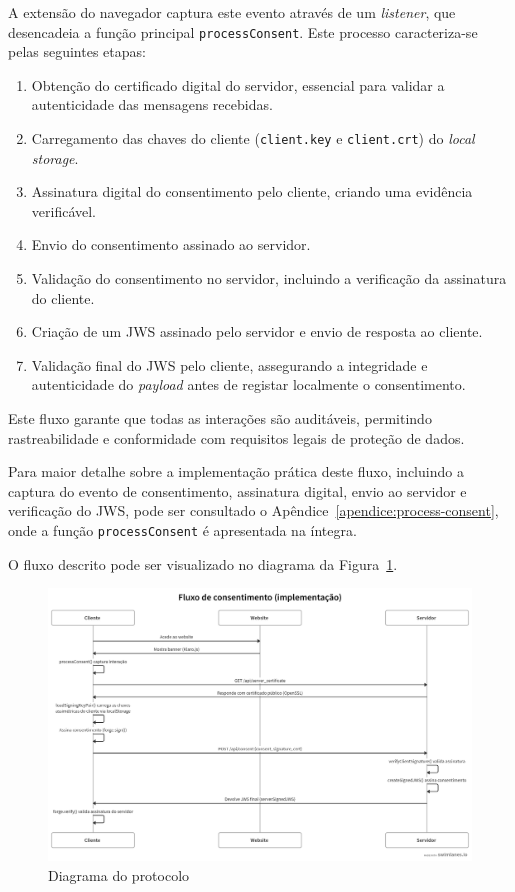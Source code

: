 A extensão do navegador captura este evento através de um \textit{listener}, que desencadeia a função principal \texttt{processConsent}. Este processo caracteriza-se pelas seguintes etapas:
\begin{enumerate}
    \item Obtenção do certificado digital do servidor, essencial para validar a autenticidade das mensagens recebidas.
    \item Carregamento das chaves do cliente (\texttt{client.key} e \texttt{client.crt}) do \textit{local storage}.
    \item Assinatura digital do consentimento pelo cliente, criando uma evidência verificável.
    \item Envio do consentimento assinado ao servidor.
    \item Validação do consentimento no servidor, incluindo a verificação da assinatura do cliente.
    \item Criação de um JWS assinado pelo servidor e envio de resposta ao cliente.
    \item Validação final do JWS pelo cliente, assegurando a integridade e autenticidade do \textit{payload} antes de registar localmente o consentimento.
\end{enumerate}

Este fluxo garante que todas as interações são auditáveis, permitindo rastreabilidade e conformidade com requisitos legais de proteção de dados.

Para maior detalhe sobre a implementação prática deste fluxo, incluindo a captura do evento de consentimento, assinatura digital, envio ao servidor e verificação do JWS, pode ser consultado o Apêndice~\ref{apendice:process-consent}, onde a função \texttt{processConsent} é apresentada na íntegra.

O fluxo descrito pode ser visualizado no diagrama da Figura~\ref{fig:swimlane-solution}.

\begin{figure}[h]
\begin{center}
\includegraphics[width=1\textwidth]{images/swimlanes_solution.png}
\end{center}
\caption{Diagrama do protocolo}
\label{fig:swimlane-solution}
\end{figure}

